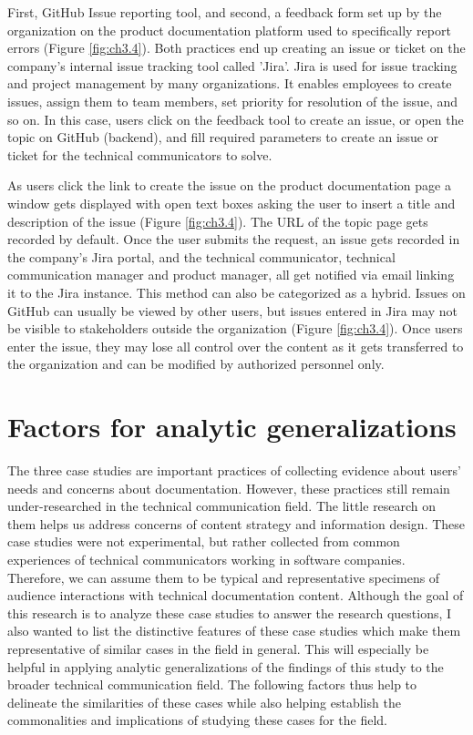 First, GitHub Issue reporting tool, and second, a feedback form set up by the organization on the product documentation platform used to specifically report errors (Figure \ref{fig:ch3.4}). Both practices end up creating an issue or ticket on the company's internal issue tracking tool called 'Jira'. Jira is used for issue tracking and project management by many organizations. It enables employees to create issues, assign them to team members, set priority for resolution of the issue, and so on. In this case, users click on the feedback tool to create an issue, or open the topic on GitHub (backend), and fill required parameters to create an issue or ticket for the technical communicators to solve.

As users click the link to create the issue on the product documentation page a window gets displayed with open text boxes asking the user to insert a title and description of the issue (Figure \ref{fig:ch3.4}). The URL of the topic page gets recorded by default. Once the user submits the request, an issue gets recorded in the company's Jira portal, and the technical communicator, technical communication manager and product manager, all get notified via email linking it to the Jira instance. This method can also be categorized as a hybrid. Issues on GitHub can usually be viewed by other users, but issues entered in Jira may not be visible to stakeholders outside the organization (Figure \ref{fig:ch3.4}). Once users enter the issue, they may lose all control over the content as it gets transferred to the organization and can be modified by authorized personnel only.

\section{Factors for analytic generalizations}
The three case studies are important practices of collecting evidence about users' needs and concerns about documentation. However, these practices still remain under-researched in the technical communication field. The little research on them helps us address concerns of content strategy and information design. These case studies were not experimental, but rather collected from common experiences of technical communicators working in software companies. Therefore, we can assume them to be typical and representative specimens of audience interactions with technical documentation content. Although the goal of this research is to analyze these case studies to answer the research questions, I also wanted to list the distinctive features of these case studies which make them representative of similar cases in the field in general. This will especially be helpful in applying analytic generalizations of the findings of this study to the broader technical communication field. The following factors thus help to delineate the similarities of these cases while also helping establish the commonalities and implications of studying these cases for the field. 

